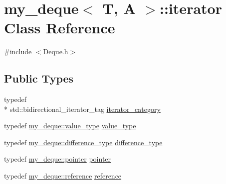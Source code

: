 \hypertarget{classmy__deque_1_1iterator}{\section{my\-\_\-deque$<$ T, A $>$\-:\-:iterator Class Reference}
\label{classmy__deque_1_1iterator}
}


{\ttfamily \#include $<$Deque.\-h$>$}

\subsection*{Public Types}
\begin{DoxyCompactItemize}
\item 
typedef \\*
std\-::bidirectional\-\_\-iterator\-\_\-tag \hyperlink{classmy__deque_1_1iterator_a0479a0f5fbb1adddafb03cd2c9aaef53}{iterator\-\_\-category}
\item 
typedef \hyperlink{classmy__deque_ae9c156c405acc57623a4601ce755596f}{my\-\_\-deque\-::value\-\_\-type} \hyperlink{classmy__deque_1_1iterator_ac6392e82698893d1802ef0407bd36794}{value\-\_\-type}
\item 
typedef \hyperlink{classmy__deque_ac85676cb2492fbc9bbc6f1a30e9d3c73}{my\-\_\-deque\-::difference\-\_\-type} \hyperlink{classmy__deque_1_1iterator_ac5f62e8566ad92478931c2abd9ac6596}{difference\-\_\-type}
\item 
typedef \hyperlink{classmy__deque_a58e82fc365a3b086367479515e1515be}{my\-\_\-deque\-::pointer} \hyperlink{classmy__deque_1_1iterator_add0e1ed49072422b5aa0ef52303fb86e}{pointer}
\item 
typedef \hyperlink{classmy__deque_a4c34c14f397b7676445b37c87003116b}{my\-\_\-deque\-::reference} \hyperlink{classmy__deque_1_1iterator_ae165ee997a9e18330c593789e9899e57}{reference}
\end{DoxyCompactItemize}
